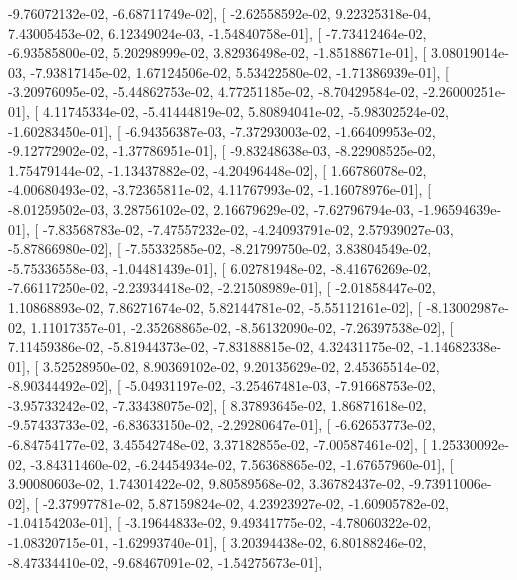 \documentclass{article}
\begin{document}
         -9.76072132e-02,  -6.68711749e-02],
       [ -2.62558592e-02,   9.22325318e-04,   7.43005453e-02,
          6.12349024e-03,  -1.54840758e-01],
       [ -7.73412464e-02,  -6.93585800e-02,   5.20298999e-02,
          3.82936498e-02,  -1.85188671e-01],
       [  3.08019014e-03,  -7.93817145e-02,   1.67124506e-02,
          5.53422580e-02,  -1.71386939e-01],
       [ -3.20976095e-02,  -5.44862753e-02,   4.77251185e-02,
         -8.70429584e-02,  -2.26000251e-01],
       [  4.11745334e-02,  -5.41444819e-02,   5.80894041e-02,
         -5.98302524e-02,  -1.60283450e-01],
       [ -6.94356387e-03,  -7.37293003e-02,  -1.66409953e-02,
         -9.12772902e-02,  -1.37786951e-01],
       [ -9.83248638e-03,  -8.22908525e-02,   1.75479144e-02,
         -1.13437882e-02,  -4.20496448e-02],
       [  1.66786078e-02,  -4.00680493e-02,  -3.72365811e-02,
          4.11767993e-02,  -1.16078976e-01],
       [ -8.01259502e-03,   3.28756102e-02,   2.16679629e-02,
         -7.62796794e-03,  -1.96594639e-01],
       [ -7.83568783e-02,  -7.47557232e-02,  -4.24093791e-02,
          2.57939027e-03,  -5.87866980e-02],
       [ -7.55332585e-02,  -8.21799750e-02,   3.83804549e-02,
         -5.75336558e-03,  -1.04481439e-01],
       [  6.02781948e-02,  -8.41676269e-02,  -7.66117250e-02,
         -2.23934418e-02,  -2.21508989e-01],
       [ -2.01858447e-02,   1.10868893e-02,   7.86271674e-02,
          5.82144781e-02,  -5.55112161e-02],
       [ -8.13002987e-02,   1.11017357e-01,  -2.35268865e-02,
         -8.56132090e-02,  -7.26397538e-02],
       [  7.11459386e-02,  -5.81944373e-02,  -7.83188815e-02,
          4.32431175e-02,  -1.14682338e-01],
       [  3.52528950e-02,   8.90369102e-02,   9.20135629e-02,
          2.45365514e-02,  -8.90344492e-02],
       [ -5.04931197e-02,  -3.25467481e-03,  -7.91668753e-02,
         -3.95733242e-02,  -7.33438075e-02],
       [  8.37893645e-02,   1.86871618e-02,  -9.57433733e-02,
         -6.83633150e-02,  -2.29280647e-01],
       [ -6.62653773e-02,  -6.84754177e-02,   3.45542748e-02,
          3.37182855e-02,  -7.00587461e-02],
       [  1.25330092e-02,  -3.84311460e-02,  -6.24454934e-02,
          7.56368865e-02,  -1.67657960e-01],
       [  3.90080603e-02,   1.74301422e-02,   9.80589568e-02,
          3.36782437e-02,  -9.73911006e-02],
       [ -2.37997781e-02,   5.87159824e-02,   4.23923927e-02,
         -1.60905782e-02,  -1.04154203e-01],
       [ -3.19644833e-02,   9.49341775e-02,  -4.78060322e-02,
         -1.08320715e-01,  -1.62993740e-01],
       [  3.20394438e-02,   6.80188246e-02,  -8.47334410e-02,
         -9.68467091e-02,  -1.54275673e-01],
\end{document}
